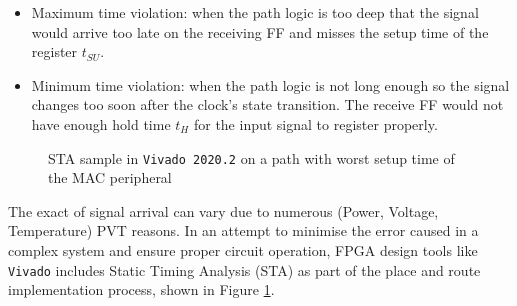 \documentclass[a4paper]{report}
\newcommand{\code}{\texttt}
\begin{document}
\begin{itemize}
    \item Maximum time violation: when the path logic is too deep that the signal would arrive too late on the receiving FF and misses the setup time of the register $t_{SU}$.
    \item Minimum time violation: when the path logic is not long enough so the signal changes too soon after the clock's state transition. The receive FF would not have enough hold time $t_{H}$ for the input signal to register properly.
\end{itemize}

\begin{figure}[h!]
  \caption{STA sample in \code{Vivado 2020.2} on a path with worst setup time of the MAC peripheral}
  \label{fig:sta-in-action}
\end{figure}

The exact of signal arrival can vary due to numerous (Power, Voltage, Temperature) PVT reasons. In an attempt to minimise the error caused in a complex system and ensure proper circuit operation, FPGA design tools like \code{Vivado} includes Static Timing Analysis (STA) as part of the place and route implementation process, shown in Figure \ref{fig:sta-in-action}.
\end{document}
